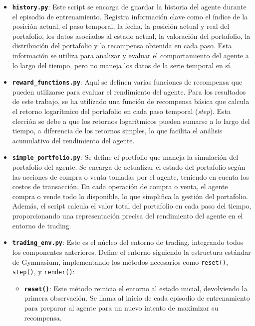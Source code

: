 \documentclass[a4paper,12pt, twoside]{report}
\begin{document}
\begin{itemize}
    \item \textbf{\texttt{history.py}}: Este script se encarga de guardar la historia del agente durante el episodio de entrenamiento. Registra información clave como el índice de la posición actual, el paso temporal, la fecha, la posición actual y real del portafolio, los datos asociados al estado actual, la valoración del portafolio, la distribución del portafolio y la recompensa obtenida en cada paso. Esta información se utiliza para analizar y evaluar el comportamiento del agente a lo largo del tiempo, pero no maneja los datos de la serie temporal en sí.

    \item \textbf{\texttt{reward\_functions.py}}: Aquí se definen varias funciones de recompensa que pueden utilizarse para evaluar el rendimiento del agente. Para los resultados de este trabajo, se ha utilizado una función de recompensa básica que calcula el retorno logarítmico del portafolio en cada paso temporal (\textit{step}). Esta elección se debe a que los retornos logarítmicos pueden sumarse a lo largo del tiempo, a diferencia de los retornos simples, lo que facilita el análisis acumulativo del rendimiento del agente.

    \item \textbf{\texttt{simple\_portfolio.py}}: Se define el portfolio que maneja la simulación del portafolio del agente. Se encarga de actualizar el estado del portafolio según las acciones de compra o venta tomadas por el agente, teniendo en cuenta los costos de transacción. En cada operación de compra o venta, el agente compra o vende todo lo disponible, lo que simplifica la gestión del portafolio. Además, el script calcula el valor total del portafolio en cada paso del tiempo, proporcionando una representación precisa del rendimiento del agente en el entorno de trading.

    \item \textbf{\texttt{trading\_env.py}}: Este es el núcleo del entorno de trading, integrando todos los componentes anteriores. Define el entorno siguiendo la estructura estándar de Gymnasium, implementando los métodos necesarios como \texttt{reset()}, \texttt{step()}, y \texttt{render()}:

    \begin{itemize}
        \item \textbf{\texttt{reset()}}: Este método reinicia el entorno al estado inicial, devolviendo la primera observación. Se llama al inicio de cada episodio de entrenamiento para preparar al agente para un nuevo intento de maximizar su recompensa.
        

\end{itemize}
\end{itemize}
\end{document}
